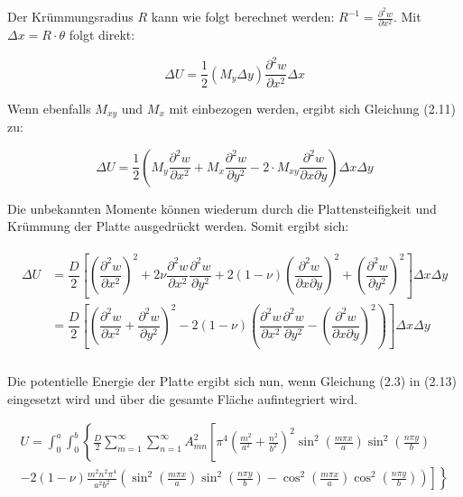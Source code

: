 Der Krümmungsradius $R$ kann wie folgt berechnet werden: $R^{-1} = \frac{\partial^2 w}{\partial x^2}$. Mit $\Delta x = R \cdot \theta$ folgt direkt:

\begin{equation}
\Delta U = \dfrac{1}{2}(M_y \Delta y) \dfrac{\partial^2 w}{\partial x^2} \Delta x
\end{equation}

Wenn ebenfalls $M_{xy}$ und $M_x$ mit einbezogen werden, ergibt sich Gleichung (2.11) zu:

\begin{equation}
\Delta U = \dfrac{1}{2}\left( M_y  \dfrac{\partial^2 w}{\partial x^2} + M_x  \dfrac{\partial^2 w}{\partial y^2} - 2 \cdot M_{xy}\dfrac{\partial^2 w}{\partial x \partial y} \right) \Delta x \Delta y
\end{equation}

Die unbekannten Momente können wiederum durch die Plattensteifigkeit und Krümmung der Platte ausgedrückt werden. Somit ergibt sich:

\begin{align}
\begin{split}
\Delta U 	&=  \dfrac{D}{2}\left[
\left(\dfrac{\partial^2 w}{\partial x^2}\right)^2
+ 2 \nu \dfrac{\partial^2 w}{\partial x^2} \dfrac{\partial^2 w}{\partial y^2}
+ 2(1-\nu) \left(\dfrac{\partial^2 w}{\partial x \partial y}\right)^2
+ \left(\dfrac{\partial^2 w}{\partial y^2}\right)^2 \right] \Delta x \Delta y\\
        	&=  \dfrac{D}{2}\left[
\left(
\dfrac{\partial^2 w}{\partial x^2} + \dfrac{\partial^2 w}{\partial y^2}\right)^2 
- 2 (1-\nu) \left( \dfrac{\partial^2 w}{\partial x^2} \dfrac{\partial^2 w}{\partial y^2} - \left( \dfrac{\partial^2 w}{\partial x \partial y} \right)^2\right) \right] \Delta x \Delta y\\
\end{split}
\end{align}



Die potentielle Energie der Platte ergibt sich nun, wenn Gleichung (2.3) in (2.13) eingesetzt wird und über die gesamte Fläche aufintegriert wird.


\begin{multline}
U =  \int_0^a \int_0^b \left\{
	\frac{D}{2} \sum_{m = 1}^{\infty}\sum_{n = 1}^{\infty} A^2_{mn}
		\left[
			\pi^4 \left(\frac{m^2}{a^2} + \frac{n^2}{b^2}\right)^2
			\sin^2\left(\frac{m\pi x}{a}\right) \sin^2\left(\frac{n\pi y}{b}\right)
			\right.
			\right. \\
			\left.
			\left.
			-2(1-\nu) 
			\frac{m^2n^2\pi^4}{a^2b^2}
			\left(
				\sin^2\left(\frac{m\pi x}{a}\right) 
				\sin^2\left(\frac{n\pi y}{b}\right)
				- 
				\cos^2\left(\frac{m\pi x}{a}\right) 
				\cos^2\left(\frac{n\pi y}{b}\right)
			\right)
		\right] 
	\right\}
\end{multline}

